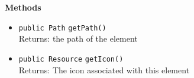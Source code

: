 \textbf{Methods}
\begin{itemize}
\item \lstinline|public Path| \lstinline|getPath|\lstinline|()|\\
Returns: the path of the element



\item \lstinline|public Resource| \lstinline|getIcon|\lstinline|()|\\
Returns: The icon associated with this element



\end{itemize}


